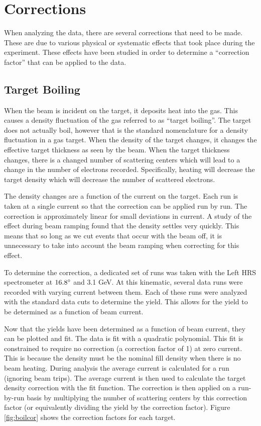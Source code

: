 \section{Corrections}

When analyzing the data, there are several corrections that need to be made. These are due to various physical or systematic effects that took place during the experiment. These effects have been studied in order to determine a ``correction factor'' that can be applied to the data.

\subsection{Target Boiling}
\label{sec:boiling}

When the beam is incident on the target, it deposits heat into the gas. This causes a density fluctuation of the gas referred to as ``target boiling''. The target does not actually boil, however that is the standard nomenclature for a density fluctuation in a gas target. When the density of the target changes, it changes the effective target thickness as seen by the beam. When the target thickness changes, there is a changed number of scattering centers which will lead to a change in the number of electrons recorded. Specifically, heating will decrease the target density which will decrease the number of scattered electrons.

The density changes are a function of the current on the target. Each run is taken at a single current so that the correction can be applied run by run. The correction is approximately linear for small deviations in current. A study of the effect during beam ramping found that the density settles very quickly. This means that so long as we cut events that occur with the beam off, it is unnecessary to take into account the beam ramping when correcting for this effect.

To determine the correction, a dedicated set of runs was taken with the Left HRS spectrometer at $16.8\degree$ and 3.1 GeV. At this kinematic, several data runs were recorded with varying current between them. Each of these runs were analyzed with the standard data cuts to determine the yield. This allows for the yield to be determined as a function of beam current.

Now that the yields have been determined as a function of beam current, they can be plotted and fit. The data is fit with a quadratic polynomial. This fit is constrained to require no correction (a correction factor of 1) at zero current. This is because the density must be the nominal fill density when there is no beam heating. During analysis the average current is calculated for a run (ignoring beam trips). The average current is then used to calculate the target density correction with the fit function. The correction is then applied on a run-by-run basis by multiplying the number of scattering centers by this correction factor (or equivalently dividing the yield by the correction factor). Figure \ref{fig:boilcor} shows the correction factors for each target.\cite{boiling}

